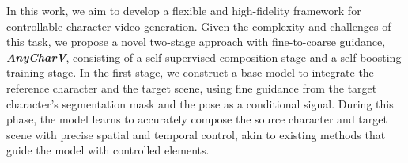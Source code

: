 

In this work, we aim to develop a flexible and high-fidelity framework for controllable character video generation. 
Given the complexity and challenges of this task, we propose a novel two-stage approach with fine-to-coarse guidance, \textbf{\textit{AnyCharV}}, consisting of a self-supervised composition stage and a self-boosting training stage.
In the first stage, we construct a base model to integrate the reference character and the target scene, using fine guidance from the target character's segmentation mask and the pose as a conditional signal. 
During this phase, the model learns to accurately compose the source character and target scene with precise spatial and temporal control, akin to existing methods that guide the model with controlled elements. 
